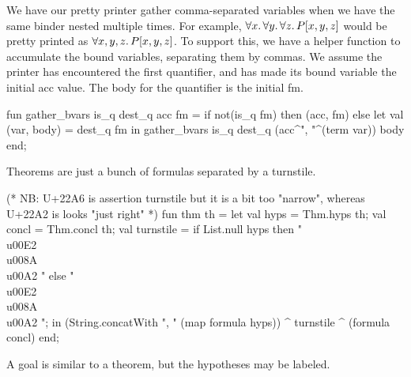 \begin{node}
We have our pretty printer gather comma-separated variables when we
have the same binder nested multiple times. For example, $\forall
x\ldotp\forall y\ldotp\forall z\ldotp P[x,y,z]$ would be pretty
printed as $\forall x,y,z\ldotp P[x,y,z]$. To support this, we have a
helper function to accumulate the bound variables, separating them by
commas. We assume the printer has encountered the first quantifier,
and has made its bound variable the initial {\Tt{}acc\nwendquote} value. The body
for the quantifier is the initial {\Tt{}fm\nwendquote}.
\end{node}

\nwenddocs{}\endmoddef\nwstartdeflinemarkup{}\nwenddeflinemarkup
fun gather_bvars is_q dest_q acc fm =
  if not(is_q fm) then (acc, fm)
  else let val (var, body) = dest_q fm
       in gather_bvars is_q dest_q (acc^", "^(term var)) body
       end;
\nwendcode{}\nwdocspar

\begin{node}
Theorems are just a bunch of formulas separated by a turnstile.
\end{node}

\nwenddocs{}\endmoddef\nwstartdeflinemarkup{}\nwenddeflinemarkup
(* NB: U+22A6 is assertion turnstile but it is a bit too "narrow",
whereas U+22A2 is looks "just right" *)
fun thm th =
  let
    val hyps = Thm.hyps th;
    val concl = Thm.concl th;
    val turnstile = if List.null hyps
                    then "\\u00E2\\u008A\\u00A2 "
                    else " \\u00E2\\u008A\\u00A2 ";
  in
    (String.concatWith ", " (map formula hyps)) ^
    turnstile ^
    (formula concl)
  end;
\eatline
{}\nwendcode{}\nwdocspar
\begin{node}
A goal is similar to a theorem, but the hypotheses may be labeled.
\end{node}

